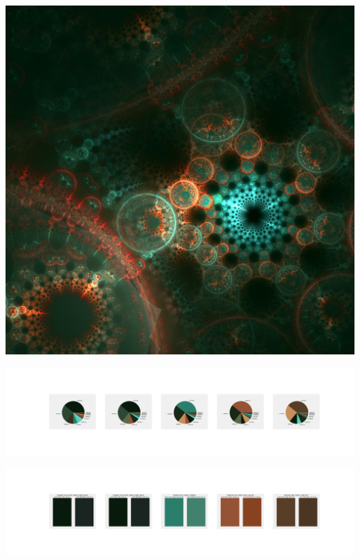 \documentclass[11pt]{article}
\begin{document}
\begin{landscape}
    \begin{center}
    \includegraphics[width=\textwidth]{./nbimg/file (227).jpg}
    \end{center}

    \begin{center}
    \includegraphics[width=250mm]{./nbimg/pie-142.jpg}
    \end{center}

    \begin{center}
    \includegraphics[width=250mm]{./nbimg/peak-142.jpg}
    \end{center}
    


\end{landscape}
\end{document}
